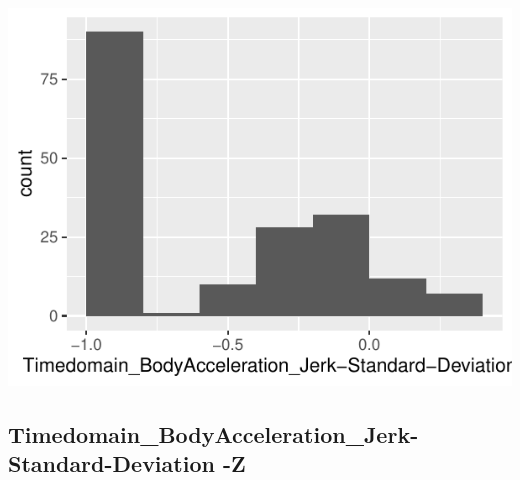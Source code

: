 \documentclass[
]{article}
\begin{document}
\begin{minipage}{0.25 \textwidth}

\includegraphics{codebook_tidydatasub_files/figure-latex/Var-19-Timedomain-BodyAcceleration-Jerk-Standard-Deviation--Y-1.pdf}

\end{minipage}

\noindent\makebox[\linewidth]{\rule{\textwidth}{0.4pt}}

\hypertarget{timedomain_bodyacceleration_jerk-standard-deviation--z}{%
\subsection{Timedomain\_BodyAcceleration\_Jerk-Standard-Deviation
-Z}\label{timedomain_bodyacceleration_jerk-standard-deviation--z}}
\end{document}
